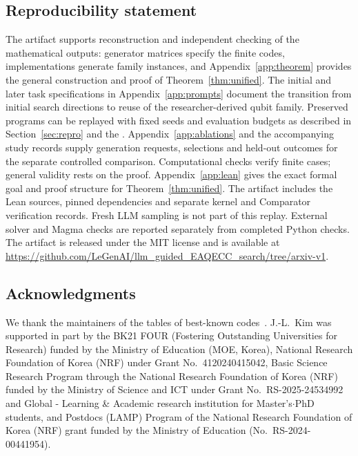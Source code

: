 \subsection*{Reproducibility statement}
The artifact supports reconstruction and independent checking of the
mathematical outputs: generator matrices specify the finite codes,
implementations generate family instances, and Appendix~\ref{app:theorem}
provides the general construction and proof of Theorem~\ref{thm:unified}.
The initial and later task specifications in Appendix~\ref{app:prompts}
document the transition from initial search directions to reuse of
the researcher-derived qubit family. Preserved programs can be replayed with fixed
seeds and evaluation budgets as described in Section~\ref{sec:repro}
and the \artifactlink{}. Appendix~\ref{app:ablations} and the accompanying
study records supply generation requests, selections and held-out
outcomes for the separate controlled comparison. Computational checks
verify finite cases; general validity rests on the proof.
Appendix~\ref{app:lean} gives the exact formal goal and proof structure
for Theorem~\ref{thm:unified}. The artifact includes the Lean sources,
pinned dependencies and separate kernel and Comparator verification records.
Fresh LLM sampling is not part of this replay. External solver
and Magma checks are reported separately from completed Python checks.
The artifact is released under the MIT license and is available at
\url{https://github.com/LeGenAI/llm_guided_EAQECC_search/tree/arxiv-v1}.

\subsection*{Acknowledgments}
We thank the maintainers of the tables of best-known
codes~\citep{Codetables}.
J.-L.~Kim was supported in part by the BK21 FOUR (Fostering Outstanding
Universities for Research) funded by the Ministry of Education (MOE, Korea),
National Research Foundation of Korea (NRF) under Grant
No.~4120240415042, Basic Science Research Program through the National
Research Foundation of Korea (NRF) funded by the Ministry of Science and ICT
under Grant No.~RS-2025-24534992 and Global - Learning \& Academic research
institution for Master's$\cdot$PhD students, and Postdocs (LAMP) Program of
the National Research Foundation of Korea (NRF) grant funded by the Ministry
of Education (No.~RS-2024-00441954).
